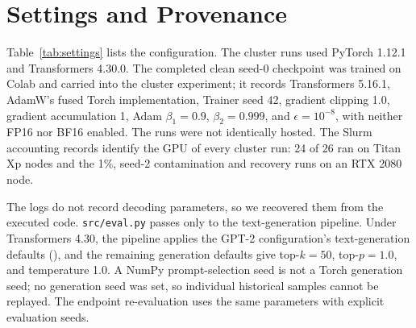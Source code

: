 \section{Settings and Provenance}
\label{app:settings}
Table~\ref{tab:settings} lists the configuration. The cluster runs used PyTorch 1.12.1 and Transformers 4.30.0. The completed clean seed-0 checkpoint was trained on Colab and carried into the cluster experiment; it records Transformers 5.16.1, AdamW's fused Torch implementation, Trainer seed 42, gradient clipping 1.0, gradient accumulation 1, Adam $\beta_1=0.9$, $\beta_2=0.999$, and $\epsilon=10^{-8}$, with neither FP16 nor BF16 enabled. The runs were not identically hosted. The Slurm accounting records identify the GPU of every cluster run: 24 of 26 ran on Titan Xp nodes and the 1\%, seed-2 contamination and recovery runs on an RTX 2080 node.

The logs do not record decoding parameters, so we recovered them from the executed code. \texttt{src/eval.py} passes only  to the text-generation pipeline. Under Transformers 4.30, the pipeline applies the GPT-2 configuration's text-generation defaults (), and the remaining generation defaults give top-$k=50$, top-$p=1.0$, and temperature 1.0. A NumPy prompt-selection seed is not a Torch generation seed; no generation seed was set, so individual historical samples cannot be replayed. The endpoint re-evaluation uses the same parameters with explicit evaluation seeds.

